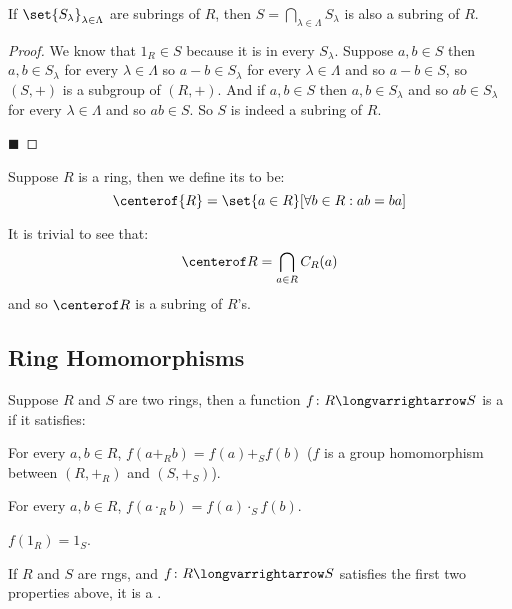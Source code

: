 \documentclass[10pt]{article}
\begin{document}
\begin{prop*}

    If $\set{S_\lambda}_{\lambda\in\Lambda}$ are subrings of $R$, then $S=\bigcap_{\lambda\in\Lambda}S_\lambda$ is also a subring of $R$.

\end{prop*}

\begin{proof}

    We know that $1_R\in S$ because it is in every $S_\lambda$.
    Suppose $a,b\in S$ then $a,b\in S_\lambda$ for every $\lambda\in\Lambda$ so $a-b\in S_\lambda$ for every $\lambda\in\Lambda$ and so $a-b\in S$, so $(S,+)$ is a subgroup of $(R,+)$.
    And if $a,b\in S$ then $a,b\in S_\lambda$ and so $ab\in S_\lambda$ for every $\lambda\in\Lambda$ and so $ab\in S$.
    So $S$ is indeed a subring of $R$.

    \hfill$\blacksquare$

\end{proof}

\begin{defn*}

    Suppose $R$ is a ring, then we define its  to be:
    \[ \centerof{R} = \set{a\in R}[\forall b\in R: ab=ba] \]

\end{defn*}

It is trivial to see that:
\[ \centerof R = \bigcap_{a\in R}C_R(a) \]
and so $\centerof R$ is a subring of $R$'s.

\subsection{Ring Homomorphisms}

\begin{defn*}

    Suppose $R$ and $S$ are two rings, then a function $f\colon R\longvarrightarrow S$ is a  if it satisfies:
    \benum
        \item For every $a,b\in R$, $f(a+_Rb)=f(a)+_Sf(b)$ ($f$ is a group homomorphism between $(R,+_R)$ and $(S,+_S)$).
        \item For every $a,b\in R$, $f(a\cdot_R b)=f(a)\cdot_Sf(b)$.
        \item $f(1_R)=1_S$.
    \eenum

    If $R$ and $S$ are rngs, and $f\colon R\longvarrightarrow S$ satisfies the first two properties above, it is a .

\end{defn*}
\end{document}
